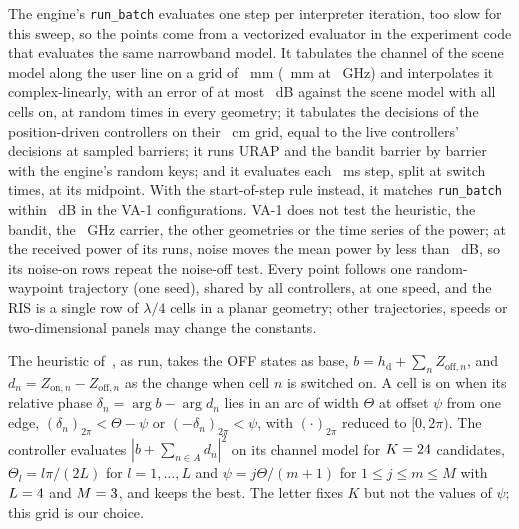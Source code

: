 The engine's \texttt{run\_batch} evaluates one step per interpreter iteration,
too slow for this sweep, so the points come from a vectorized evaluator in the experiment code
that evaluates the same narrowband model. It tabulates the channel of the scene model along the
user line on a grid of \numEaFineGridMm~mm (\numEaFineGridHiMm~mm at \numEaFcTwoGHz~GHz) and
interpolates it complex-linearly, with an error of at most \numEaInterpMaxDb~dB against the
scene model with all cells on, at random times in every geometry; it tabulates the decisions of the
position-driven controllers on their \numEaCoarseGridCm~cm grid, equal to the live controllers'
decisions at \numEaDecisionBarriers{} sampled barriers; it runs URAP and the bandit barrier by
barrier with the engine's random keys; and it evaluates each \numEaStepMs~ms step, split at
switch times, at its midpoint. With the start-of-step rule instead, it matches \texttt{run\_batch}
within \numVaOneVecLeftDb~dB in the VA-1 configurations. VA-1 does not test the heuristic, the
bandit, the \numEaFcTwoGHz~GHz carrier, the other geometries or the time series of the power;
at the received power of its runs, noise moves the mean power by less than
\numVaOneNoiseDiffDb~dB, so its noise-on rows repeat the noise-off test. Every point follows
one random-waypoint trajectory (one seed), shared by all controllers, at one speed, and the RIS
is a single row of $\lambda/4$ cells in a planar geometry; other trajectories, speeds or
two-dimensional panels may change the constants.

The heuristic of~\cite{Mishra2025WCL}, as run, takes the OFF states as base,
$b=h_{\mathrm{d}}+\sum_nZ_{\mathrm{off},n}$, and $d_n=Z_{\mathrm{on},n}-Z_{\mathrm{off},n}$ as the
change when cell $n$ is switched on. A cell is on when its relative phase
$\delta_n=\arg b-\arg d_n$ lies in an arc of width $\Theta$ at offset $\psi$ from one edge,
$(\delta_n)_{2\pi}<\Theta-\psi$ or $(-\delta_n)_{2\pi}<\psi$, with $(\cdot)_{2\pi}$ reduced to
$[0,2\pi)$. The controller evaluates $|b+\sum_{n\in A}d_n|^2$ on its channel model for
$K=24$ candidates, $\Theta_l=l\pi/(2L)$ for $l=1,\dots,L$ and $\psi=j\Theta/(m+1)$ for
$1\le j\le m\le M$ with $L=4$ and $M=3$, and keeps the best. The letter fixes
$K$ but not the values of $\psi$; this grid is our choice.



